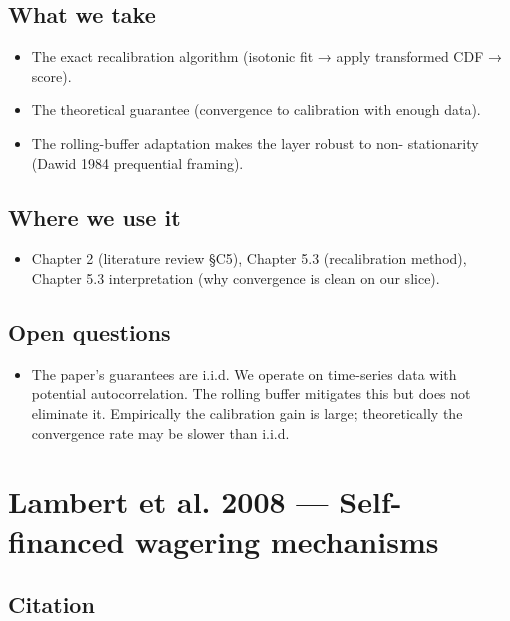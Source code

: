 \documentclass[11pt,a4paper,openany]{report}
\begin{document}
\section{What we take}

\begin{itemize}
  \item The exact recalibration algorithm (isotonic fit → apply transformed
    CDF → score).
  \item The theoretical guarantee (convergence to calibration with enough
    data).
  \item The rolling-buffer adaptation makes the layer robust to non-
    stationarity (Dawid 1984 prequential framing).
\end{itemize}

\section{Where we use it}

\begin{itemize}
  \item Chapter 2 (literature review §C5), Chapter 5.3 (recalibration
    method), Chapter 5.3 interpretation (why convergence is clean on
    our slice).
\end{itemize}

\section{Open questions}

\begin{itemize}
  \item The paper's guarantees are i.i.d. We operate on time-series data
    with potential autocorrelation. The rolling buffer mitigates this
    but does not eliminate it. Empirically the calibration gain is
    large; theoretically the convergence rate may be slower than i.i.d.
\end{itemize}

\chapter{Lambert et al. 2008 — Self-financed wagering mechanisms}

\section{Citation}
\end{document}
